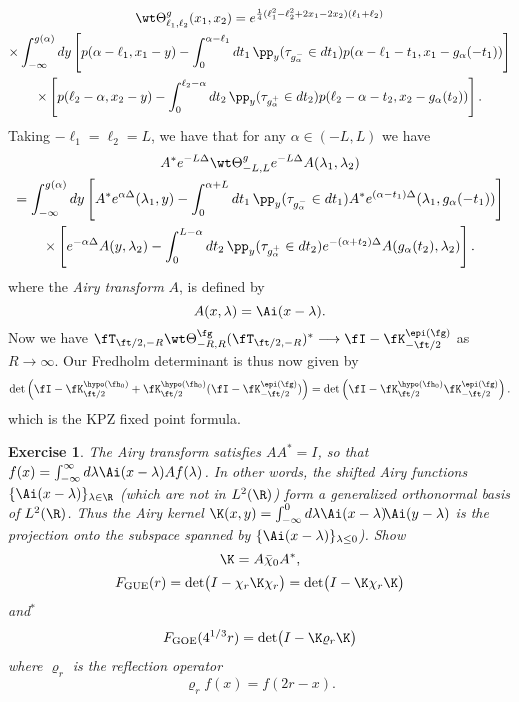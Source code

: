\documentclass[]{pcmi}
\theoremstyle{plain}
\newtheorem{exercise}[equation]{Exercise}
\theoremstyle{definition}
\begin{document}
\begin{multline*}
  \wt\Theta^g_{\ell_1,\ell_2}(x_1,x_2)=e^{\frac14(\ell_1^2-\ell_2^2+2x_1-2x_2)(\ell_1+\ell_2)}\\
  \times\int_{-\infty}^{g(\alpha)}dy\left[p(\alpha-\ell_1 , x_1-y)-\int_0^{\alpha-\ell_1}dt_1\,\pp_{y}(\tau_{g_\alpha^-}\in dt_1)p(\alpha-\ell_1 - t_1, x_1-g_\alpha(-t_1))\right]\\
  \times\left[p(\ell_2-\alpha , x_2-y)-\int_{0}^{\ell_2-\alpha}dt_2\,\pp_{y}(\tau_{g_\alpha^+}\in
    dt_2)p(\ell_2 -\alpha- t_2, x_2-g_\alpha(t_2))\right].
\end{multline*}
Taking $-\ell_1=\ell_2=L$, we have that 
  for any $\alpha\in(-L,L)$ we have
  \begin{multline*}
    A^*e^{-L\Delta}\wt\Theta^g_{-L,L}e^{-L\Delta}A(\lambda_1,\lambda_2)\\
    =\int_{-\infty}^{g(\alpha)}dy\left[A^*e^{\alpha \Delta}(\lambda_1,y)-\int_{0}^{\alpha+L}dt_1\,\pp_y(\tau_{g_\alpha^-}\in
      dt_1)A^*e^{(\alpha-t_1)\Delta}(\lambda_1,g_\alpha(-t_1))\right]\\\times
    \left[e^{-\alpha \Delta}A(y,\lambda_2)-\int_{0}^{L-\alpha}dt_2\,\pp_y(\tau_{g_\alpha^+}\in
      dt_2)e^{-(\alpha+t_2)\Delta}A(g_\alpha(t_2),\lambda_2)\right].
  \end{multline*}
where  the \emph{Airy transform} $A$, is defined by
\begin{equation}
  \label{eq:B0}
  A(x,\lambda)=\Ai(x-\lambda).
\end{equation}
Now we have  $\fT_{\ft/2,-R}\wt\Theta^{\fg}_{-R,R}(\fT_{\ft/2,-R})^*\longrightarrow \fI-\fK^{\epi(\fg)}_{-\ft/2}$ as $R\to\infty$.
Our Fredholm determinant is thus now given by
\[
\det\left(\fI-\fK^{\hypo(\fh_0)}_{\ft/2}+\fK^{\hypo(\fh_0)}_{\ft/2}(\fI-\fK^{\epi(\fg)}_{-\ft/2})\right)
=\det\left(\fI-\fK^{\hypo(\fh_0)}_{\ft/2}\fK^{\epi(\fg)}_{-\ft/2}\right).\label{eq:preThmfixedpt}
\]
which is the KPZ fixed point formula.

\begin{exercise} The Airy transform satisfies $AA^*=I$, so that $f(x)=\int_{-\infty}^\infty d\lambda\Ai(x-\lambda)Af(\lambda)$.
In other words, the shifted Airy functions $\{\Ai(x-\lambda)\}_{\lambda\in\R}$ (which are not in $L^2(\R)$) form a generalized orthonormal basis of $L^2(\R)$. Thus the \emph{Airy kernel}  $\K(x,y)=\int_{-\infty}^0 d\lambda\Ai(x-\lambda)\!\Ai(y-\lambda)$ is the projection onto the subspace spanned by $\{\Ai(x-\lambda)\}_{\lambda\leq0}$).  Show \begin{equation}\label{eq:K-AiryTr}
 	\K=A\bar \chi_0A^*,
\end{equation} 
\begin{equation}\label{eq:FGUE}
	F_{\rm GUE}(r)=\det\!\big(I-\chi_r\K \chi_r\big)=\det\!\big(I-\K \chi_r\K\big)
\end{equation}
and$^{*}$
\begin{equation}\label{eq:FGOE}
	F_{\rm GOE}(4^{1/3}r)=\det\!\big(I-\K\varrho_r\K\big)
\end{equation}
where $\varrho_r$ is the reflection operator
\begin{equation}\label{eq:varrho}
	\varrho_rf(x)=f(2r-x).
\end{equation}
\end{exercise}


\bibspread


\end{document}
